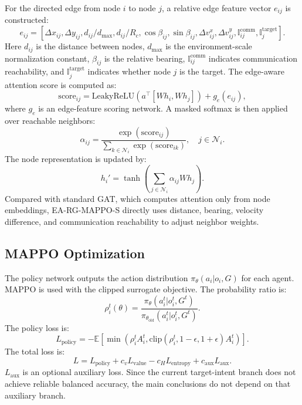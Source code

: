 For the directed edge from node $i$ to node $j$, a relative edge feature vector $e_{ij}$ is constructed:
\begin{equation}
e_{ij}=[\Delta x_{ij},\Delta y_{ij},d_{ij}/d_{\max},d_{ij}/R_c,
\cos\beta_{ij},\sin\beta_{ij},\Delta v^x_{ij},\Delta v^y_{ij},
\mathbb{I}_{ij}^{\mathrm{comm}},\mathbb{I}_{j}^{\mathrm{target}}].
\end{equation}
Here $d_{ij}$ is the distance between nodes, $d_{\max}$ is the environment-scale normalization constant, $\beta_{ij}$ is the relative bearing, $\mathbb{I}_{ij}^{\mathrm{comm}}$ indicates communication reachability, and $\mathbb{I}_{j}^{\mathrm{target}}$ indicates whether node $j$ is the target. The edge-aware attention score is computed as:
\begin{equation}
\mathrm{score}_{ij}=\mathrm{LeakyReLU}\left(a^\top[Wh_i,Wh_j]\right)+g_e(e_{ij}),
\end{equation}
where $g_e$ is an edge-feature scoring network. A masked softmax is then applied over reachable neighbors:
\begin{equation}
\alpha_{ij}=\frac{\exp(\mathrm{score}_{ij})}{\sum_{k\in\mathcal{N}_i}\exp(\mathrm{score}_{ik})}, \quad j\in\mathcal{N}_i.
\end{equation}
The node representation is updated by:
\begin{equation}
h_i'=\tanh\left(\sum_{j\in\mathcal{N}_i}\alpha_{ij}Wh_j\right).
\end{equation}
Compared with standard GAT, which computes attention only from node embeddings, EA-RG-MAPPO-S directly uses distance, bearing, velocity difference, and communication reachability to adjust neighbor weights.

\subsection{MAPPO Optimization}

The policy network outputs the action distribution $\pi_\theta(a_i|o_i,G)$ for each agent. MAPPO is used with the clipped surrogate objective. The probability ratio is:
\begin{equation}
\rho_i^t(\theta)=\frac{\pi_\theta(a_i^t|o_i^t,G^t)}{\pi_{\theta_{\mathrm{old}}}(a_i^t|o_i^t,G^t)}.
\end{equation}
The policy loss is:
\begin{equation}
L_{\mathrm{policy}}=-\mathbb{E}\left[\min\left(\rho_i^t A_i^t,\mathrm{clip}(\rho_i^t,1-\epsilon,1+\epsilon)A_i^t\right)\right].
\end{equation}
The total loss is:
\begin{equation}
L=L_{\mathrm{policy}}+c_vL_{\mathrm{value}}-c_HL_{\mathrm{entropy}}+c_{\mathrm{aux}}L_{\mathrm{aux}}.
\end{equation}
$L_{\mathrm{aux}}$ is an optional auxiliary loss. Since the current target-intent branch does not achieve reliable balanced accuracy, the main conclusions do not depend on that auxiliary branch.

